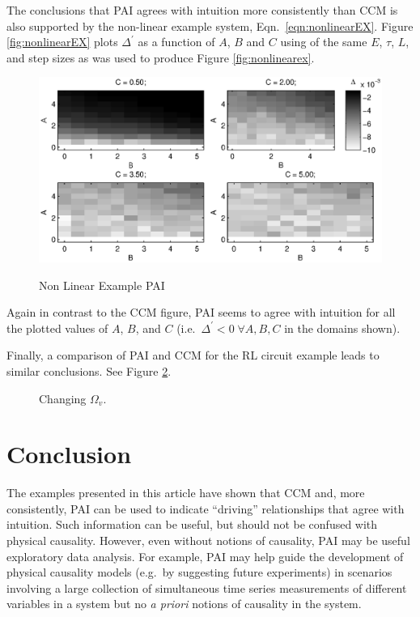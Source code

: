 \documentclass[a4paper,11pt,twocolumn]{article}
\begin{document}
The conclusions that PAI agrees with intuition more consistently than CCM is also supported by the non-linear example system, Eqn.\ \ref{eqn:nonlinearEX}.  Figure \ref{fig:nonlinearEX} plots $\Delta^\prime$ as a function of $A$, $B$ and $C$ using of the same $E$, $\tau$, $L$, and step sizes as was used to produce Figure \ref{fig:nonlinearex}.
\begin{figure}[ht]
\includegraphics[scale=0.55]{NonLinearPAIEx.eps} \\
\caption{Non Linear Example PAI}
\label{fig:nonlinearEXPAI}
\end{figure}
Again in contrast to the CCM figure, PAI seems to agree with intuition for all the plotted values of $A$, $B$, and $C$ (i.e.\ $\Delta^\prime<0\;\forall A,B,C$ in the domains shown).

Finally, a comparison of PAI and CCM for the RL circuit example leads to similar conclusions.  See Figure \ref{fig:AvPAI}.
\begin{figure}[ht]
\caption{Changing $\Omega_v$.}
\label{fig:AvPAI}
\end{figure}

\section{Conclusion}
The examples presented in this article have shown that CCM and, more consistently, PAI can be used to indicate ``driving'' relationships that agree with intuition.  Such information can be useful, but should not be confused with physical causality.  However, even without notions of causality, PAI may be useful exploratory data analysis.  For example, PAI may help guide the development of physical causality models (e.g.\ by suggesting future experiments) in scenarios involving a large collection of simultaneous time series measurements of different variables in a system but no {\em a priori} notions of causality in the system.
\end{document}
